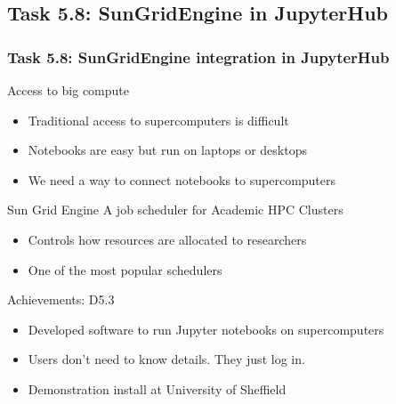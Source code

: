 \documentclass{beamer}
\begin{document}
\subsection{Task 5.8: SunGridEngine in JupyterHub}
\begin{frame}
  \frametitle{Task 5.8: SunGridEngine integration in JupyterHub}
  \begin{block}{Access to big compute}
   \begin{itemize}
   \item Traditional access to supercomputers is difficult
   \item Notebooks are easy but run on laptops or desktops
   \item We need a way to connect notebooks to supercomputers
   \end{itemize}
  \end{block}
  \begin{block}{Sun Grid Engine}
    A job scheduler for Academic HPC Clusters
    \begin{itemize}
    \item Controls how resources are allocated to researchers
    \item One of the most popular schedulers
    \end{itemize}
  \end{block}

  \begin{block}{Achievements: D5.3}
  \begin{itemize}
  \item Developed software to run Jupyter notebooks on supercomputers
  \item Users don't need to know details. They just log in.
  \item Demonstration install at University of Sheffield
  \end{itemize}
  \end{block}
\end{frame}

\end{document}

